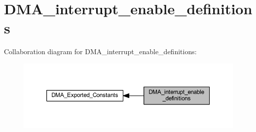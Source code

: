 \hypertarget{group___d_m_a__interrupt__enable__definitions}{}\section{D\+M\+A\+\_\+interrupt\+\_\+enable\+\_\+definitions}
\label{group___d_m_a__interrupt__enable__definitions}
Collaboration diagram for D\+M\+A\+\_\+interrupt\+\_\+enable\+\_\+definitions\+:
\nopagebreak
\begin{figure}[H]
\begin{center}
\leavevmode
\includegraphics[width=350pt]{group___d_m_a__interrupt__enable__definitions}
\end{center}
\end{figure}
